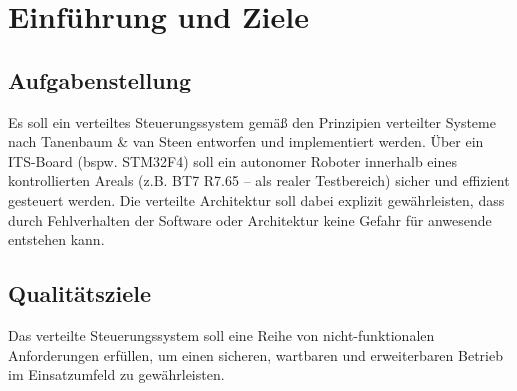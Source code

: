 \chapter{Einführung und Ziele}

\section{Aufgabenstellung}

Es soll ein verteiltes Steuerungssystem gemäß den Prinzipien verteilter Systeme nach Tanenbaum \& van Steen entworfen und implementiert werden. Über ein ITS-Board (bspw. STM32F4) soll ein autonomer Roboter innerhalb eines kontrollierten Areals (z.B. BT7 R7.65 – als realer Testbereich) sicher und effizient gesteuert werden. Die verteilte Architektur soll dabei explizit gewährleisten, dass durch Fehlverhalten der Software oder Architektur keine Gefahr für anwesende entstehen kann.


\section{Qualitätsziele}

Das verteilte Steuerungssystem soll eine Reihe von nicht-funktionalen Anforderungen erfüllen, um einen sicheren, wartbaren und erweiterbaren Betrieb im Einsatzumfeld zu gewährleisten. 

